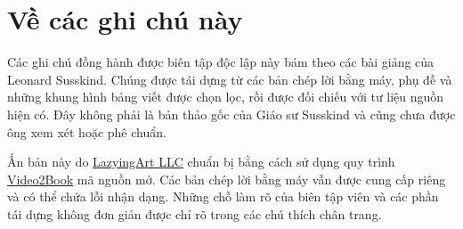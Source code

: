 \documentclass[11pt,oneside]{book}
\begin{document}
\frontmatter
\hypersetup{pageanchor=false}

\hypersetup{pageanchor=true}

\clearpage
\chapter*{Về các ghi chú này}
Các ghi chú đồng hành được biên tập độc lập này bám theo các bài giảng của Leonard Susskind. Chúng được tái dựng từ các bản chép lời bằng máy, phụ đề và những khung hình bảng viết được chọn lọc, rồi được đối chiếu với tư liệu nguồn hiện có. Đây không phải là bản thảo gốc của Giáo sư Susskind và cũng chưa được ông xem xét hoặc phê chuẩn.

Ấn bản này do \href{https://lazying.art}{LazyingArt LLC} chuẩn bị bằng cách sử dụng quy trình \href{https://github.com/lachlanchen/Video2Book}{Video2Book} mã nguồn mở. Các bản chép lời bằng máy vẫn được cung cấp riêng và có thể chứa lỗi nhận dạng. Những chỗ làm rõ của biên tập viên và các phần tái dựng không đơn giản được chỉ rõ trong các chú thích chân trang.
\clearpage
\tableofcontents
\mainmatter










\end{document}
